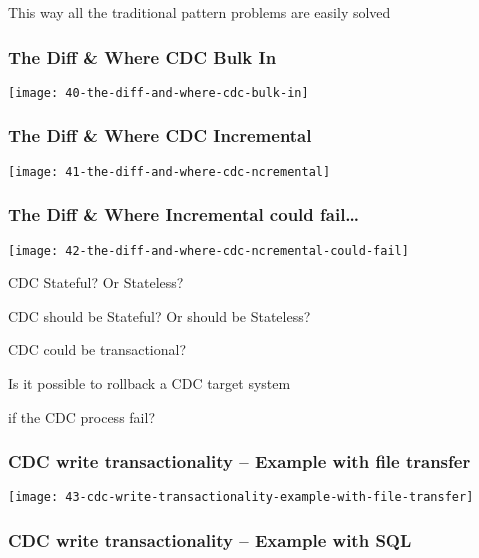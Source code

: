 This way all the traditional pattern problems are easily solved

\subsubsection{The Diff \& Where CDC Bulk In}

\begin{center}
\texttt{[image: 40-the-diff-and-where-cdc-bulk-in]}
\end{center}

\subsubsection{The Diff \& Where CDC Incremental}

\begin{center}
\texttt{[image: 41-the-diff-and-where-cdc-ncremental]}
\end{center}

\subsubsection{The Diff \& Where Incremental could fail…}

\begin{center}
\texttt{[image: 42-the-diff-and-where-cdc-ncremental-could-fail]}
\end{center}

\begin{center}
CDC Stateful? Or Stateless?

CDC should be Stateful? Or should be Stateless?

CDC could be transactional?

Is it possible to rollback a CDC target system

if the CDC process fail?
\end{center}

\subsubsection{CDC write transactionality – Example with file transfer}

\begin{center}
\texttt{[image: 43-cdc-write-transactionality-example-with-file-transfer]}
\end{center}

\subsubsection{CDC write transactionality – Example with SQL}

